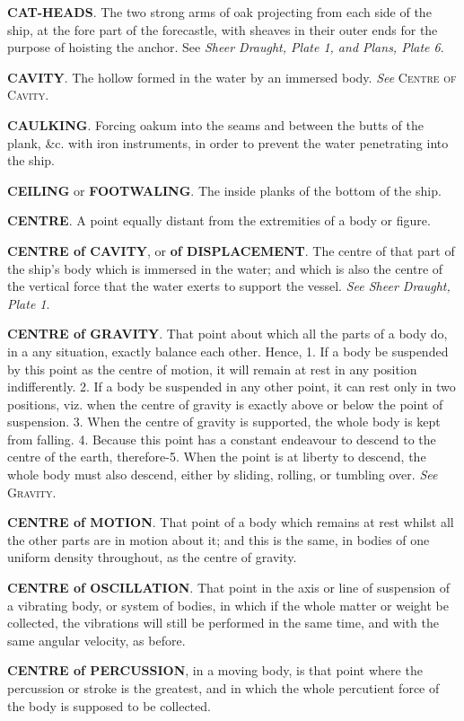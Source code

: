 \textbf{CAT-HEADS}. The two strong arms of oak projecting from each side of the ship, at the fore part of the forecastle, with sheaves in their outer ends for the purpose of hoisting the anchor. See \textit{Sheer Draught, Plate 1, and Plans, Plate 6}. 

\textbf{CAVITY}. The hollow formed in the water by an immersed body. \textit{See} \textsc{Centre of Cavity}. 

\textbf{CAULKING}. Forcing oakum into the seams and between the butts of the plank, \&c. with iron instruments, in order to prevent the water penetrating into the ship. 

\textbf{CEILING} or \textbf{FOOTWALING}. The inside planks of the bottom of the ship. 

\textbf{CENTRE}. A point equally distant from the extremities of a body or figure. 

\textbf{CENTRE of CAVITY}, or \textbf{of DISPLACEMENT}. The centre of that part of the ship's body which is immersed in the water; and which is also the centre of the vertical force that the water exerts to support the vessel. \textit{See Sheer Draught, Plate 1}. 

\textbf{CENTRE of GRAVITY}. That point about which all the parts of a body do, in a any situation, exactly balance each other. Hence, 1. If a body be suspended by this point as the centre of motion, it will remain at rest in any position indifferently. 2. If a body be suspended in any other point, it can rest only in two positions, viz. when the centre of gravity is exactly above or below the point of suspension. 3. When the centre of gravity is supported, the whole body is kept from falling. 4. Because this point has a constant endeavour to descend to the centre of the earth, therefore-5. When the point is at liberty to descend, the whole body must also descend, either by sliding, rolling, or tumbling over. \textit{See} \textsc{Gravity}. 

\textbf{CENTRE of MOTION}. That point of a body which remains at rest whilst all the other parts are in motion about it; and this is the same, in bodies of one uniform density throughout, as the centre of gravity. 

\textbf{CENTRE of OSCILLATION}. That point in the axis or line of suspension of a vibrating body, or system of bodies, in which if the whole matter or weight be collected, the vibrations will still be performed in the same time, and with the same angular velocity, as before. 

\textbf{CENTRE of PERCUSSION}, in a moving body, is that point where the percussion or stroke is the greatest, and in which the whole percutient force of the body is supposed to be collected.

